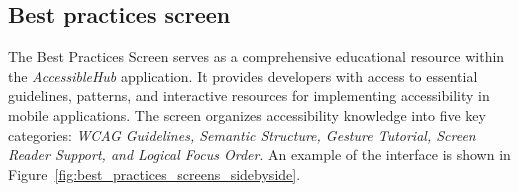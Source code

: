\subsection{Best practices screen}

The Best Practices Screen serves as a comprehensive educational resource within the \textit{AccessibleHub} application. It provides developers with access to essential guidelines, patterns, and interactive resources for implementing accessibility in mobile applications. The screen organizes accessibility knowledge into five key categories: \textit{WCAG Guidelines, Semantic Structure, Gesture Tutorial, Screen Reader Support, and Logical Focus Order}. An example of the interface is shown in Figure~\ref{fig:best_practices_screens_sidebyside}.

\begin{figure}[ht]
    \centering
    \begin{subfigure}[b]{0.48\textwidth}
        \centering

\end{subfigure}
\end{figure}
